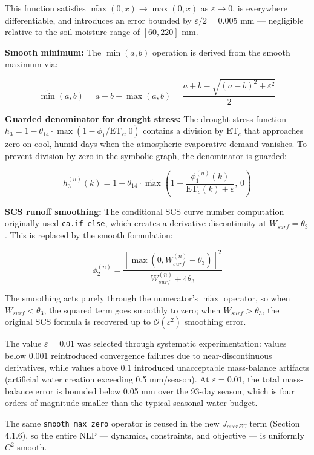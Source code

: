 This function satisfies \(\widetilde{\max}(0, x) \to \max(0, x)\) as
\(\varepsilon \to 0\), is everywhere differentiable, and introduces an
error bounded by \(\varepsilon/2 = 0.005\) mm --- negligible relative to
the soil moisture range of \([60, 220]\) mm.

\textbf{Smooth minimum:} The \(\min(a, b)\) operation is derived from
the smooth maximum via:

\[\widetilde{\min}(a, b) = a + b - \widetilde{\max}(a, b) = \frac{a + b - \sqrt{(a-b)^2 + \varepsilon^2}}{2} \tag{19}\]

\textbf{Guarded denominator for drought stress:} The drought stress
function
\(h_3 = 1 - \theta_{14} \cdot \max(1 - \phi_1 / \text{ET}_c, 0)\)
contains a division by \(\text{ET}_c\) that approaches zero on cool,
humid days when the atmospheric evaporative demand vanishes. To prevent
division by zero in the symbolic graph, the denominator is guarded:

\[h_3^{(n)}(k) = 1 - \theta_{14} \cdot \widetilde{\max}\left(1 - \frac{\phi_1^{(n)}(k)}{\text{ET}_c(k) + \varepsilon},\, 0\right) \tag{20}\]

\textbf{SCS runoff smoothing:} The conditional SCS curve number
computation originally used \texttt{ca.if\_else}, which creates a
derivative discontinuity at \(W_{surf} = \theta_3\). This is replaced by
the smooth formulation:

\[\phi_2^{(n)} = \frac{\left[\widetilde{\max}(0, W_{surf}^{(n)} - \theta_3)\right]^2}{W_{surf}^{(n)} + 4\theta_3} \tag{21}\]

The smoothing acts purely through the numerator's \(\widetilde{\max}\)
operator, so when \(W_{surf} < \theta_3\), the squared term goes
smoothly to zero; when \(W_{surf} > \theta_3\), the original SCS formula
is recovered up to \(\mathcal{O}(\varepsilon^2)\) smoothing error.

The value \(\varepsilon = 0.01\) was selected through systematic
experimentation: values below \(0.001\) reintroduced convergence
failures due to near-discontinuous derivatives, while values above
\(0.1\) introduced unacceptable mass-balance artifacts (artificial water
creation exceeding 0.5 mm/season). At \(\varepsilon = 0.01\), the total
mass-balance error is bounded below 0.05 mm over the 93-day season,
which is four orders of magnitude smaller than the typical seasonal
water budget.

The same \texttt{smooth\_max\_zero} operator is reused in the new
\(J_{overFC}\) term (Section 4.1.6), so the entire NLP --- dynamics,
constraints, and objective --- is uniformly \(C^2\)-smooth.

